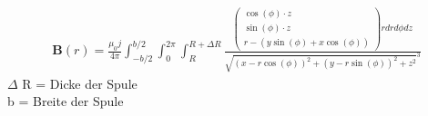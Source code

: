 \documentclass[12pt,a4paper]{article}
\begin{document}
\begin{align*}
\textbf{B}(r) = \frac{\mu_0j}{4\pi}\int_{-b/2}^{b/2}\int_{0}^{2\pi}\int_{R}^{R+\Delta R} \frac{\begin{pmatrix}
\cos(\phi)\cdot z \\
\sin(\phi)\cdot z \\
r-(y\sin(\phi)+x\cos(\phi))
\end{pmatrix}r dr d\phi dz}{\sqrt{(x-r\cos(\phi))^2+(y-r\sin(\phi))^2+z^2}^3}
\end{align*}
$\Delta$ R = Dicke der Spule \\
b = Breite der Spule
\end{document}
